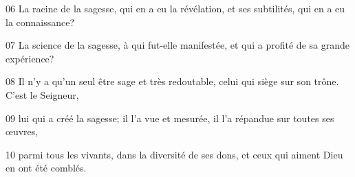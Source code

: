 
06 La racine de la sagesse, qui en a eu la révélation, et ses subtilités, qui en a eu la connaissance?

07 La science de la sagesse, à qui fut-elle manifestée, et qui a profité de sa grande expérience?

08 Il n’y a qu’un seul être sage et très redoutable, celui qui siège sur son trône. C’est le Seigneur,

09 lui qui a créé la sagesse; il l’a vue et mesurée, il l’a répandue sur toutes ses œuvres,

10 parmi tous les vivants, dans la diversité de ses dons, et ceux qui aiment Dieu en ont été comblés.
